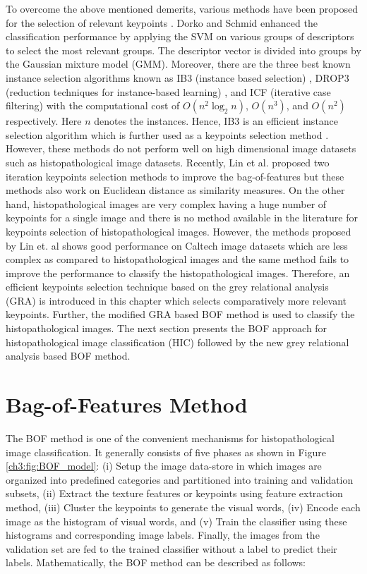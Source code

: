 To overcome the above mentioned demerits, various methods have been proposed for the selection of relevant keypoints  \cite{brighton2002} \cite{Dorko2003}. Dorko and Schmid \cite{Dorko2003} enhanced the classification performance by applying the SVM on various groups of descriptors to select the most relevant groups. The descriptor vector is divided into groups by the Gaussian mixture model (GMM). Moreover, there are the three best known instance selection algorithms known as IB3 (instance based selection) \cite{aha1991}, DROP3 (reduction techniques for instance-based learning) \cite{wilson2000}, and ICF (iterative case filtering) \cite{brighton2002} with the computational cost of $O(n^2\log_2 n)$, $O(n^3)$, and $O(n^2)$ respectively. Here $n$ denotes the instances. Hence, IB3 is an efficient instance selection algorithm which is further used as a keypoints selection method \cite{lin2016}. However, these methods do not perform well on high dimensional image datasets such as histopathological image datasets. Recently, Lin et al. \cite{lin2016} proposed two iteration keypoints selection methods to improve the bag-of-features but these methods also work on Euclidean distance as similarity measures. On the other hand, histopathological images are very complex having a huge number of keypoints for a single image and there is no method available in the literature for keypoints selection of histopathological images. However, the methods proposed by Lin et. al \cite{lin2016} shows good performance on Caltech image datasets which are less complex as compared to histopathological images and the same method fails to improve the performance to classify the histopathological images. Therefore, an efficient keypoints selection technique based on the grey relational analysis (GRA) is introduced in this chapter which selects comparatively more relevant keypoints. Further, the modified GRA based BOF method is used to classify the histopathological images. The next section presents the BOF approach for histopathological image classification (HIC) followed by the new grey relational analysis based BOF method.

\section{Bag-of-Features Method} \label{ch3:sec:Bag-of-Features Method}

The BOF method is one of the convenient mechanisms for histopathological image classification. It generally consists of five phases as shown in Figure \ref{ch3:fig:BOF_model}:  (i) Setup the image data-store in which  images are organized into predefined categories and partitioned into training and validation subsets, (ii) Extract the texture features or keypoints using feature extraction method, (iii) Cluster the keypoints to generate the visual words, (iv) Encode each image as the histogram of visual words, and (v) Train the classifier using these histograms and corresponding image labels. Finally, the images from the validation set are fed to the trained classifier without a label to predict their labels. Mathematically, the BOF method can be described  as follows:

